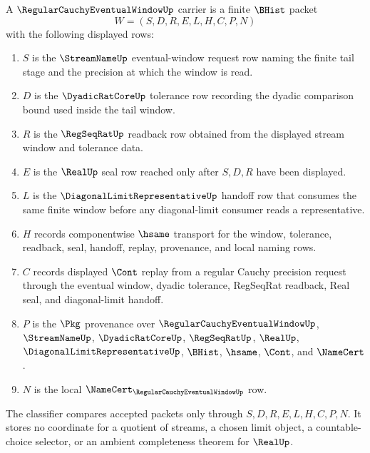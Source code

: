 \begin{definition}
\label{def:regular-cauchy-eventual-window-carrier}
A $\RegularCauchyEventualWindowUp$ carrier is a finite $\BHist$ packet
$$
W=(S,D,R,E,L,H,C,P,N)
$$
with the following displayed rows:
\begin{enumerate}
\item $S$ is the $\StreamNameUp$ eventual-window request row naming the finite tail stage and the precision at which the window is read.
\item $D$ is the $\DyadicRatCoreUp$ tolerance row recording the dyadic comparison bound used inside the tail window.
\item $R$ is the $\RegSeqRatUp$ readback row obtained from the displayed stream window and tolerance data.
\item $E$ is the $\RealUp$ seal row reached only after $S,D,R$ have been displayed.
\item $L$ is the $\DiagonalLimitRepresentativeUp$ handoff row that consumes the same finite window before any diagonal-limit consumer reads a representative.
\item $H$ records componentwise $\hsame$ transport for the window, tolerance, readback, seal, handoff, replay, provenance, and local naming rows.
\item $C$ records displayed $\Cont$ replay from a regular Cauchy precision request through the eventual window, dyadic tolerance, RegSeqRat readback, Real seal, and diagonal-limit handoff.
\item $P$ is the $\Pkg$ provenance over $\RegularCauchyEventualWindowUp$, $\StreamNameUp$, $\DyadicRatCoreUp$, $\RegSeqRatUp$, $\RealUp$, $\DiagonalLimitRepresentativeUp$, $\BHist$, $\hsame$, $\Cont$, and $\NameCert$.
\item $N$ is the local $\NameCert_{\RegularCauchyEventualWindowUp}$ row.
\end{enumerate}
The classifier compares accepted packets only through $S,D,R,E,L,H,C,P,N$. It stores no coordinate for a quotient of streams, a chosen limit object, a countable-choice selector, or an ambient completeness theorem for $\RealUp$.
\end{definition}

